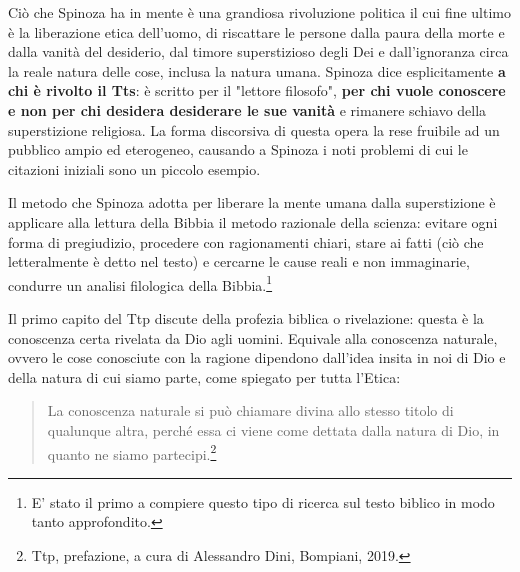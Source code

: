 Ciò che Spinoza ha in mente è
una grandiosa rivoluzione politica il cui fine ultimo è la liberazione etica dell'uomo, di riscattare le persone dalla paura
della morte e dalla vanità del desiderio, dal timore superstizioso degli Dei e dall'ignoranza circa la
reale natura delle cose, inclusa la natura umana. Spinoza dice esplicitamente \textbf{a chi è rivolto il Tts}: è scritto per il "lettore filosofo", \textbf{per chi vuole conoscere e non per chi desidera desiderare le sue vanità} e rimanere schiavo della superstizione religiosa. La forma  discorsiva di questa opera la rese fruibile ad un pubblico ampio ed eterogeneo, causando a Spinoza i noti problemi di cui le citazioni iniziali sono un piccolo esempio.

Il metodo che Spinoza adotta per liberare la mente umana dalla superstizione è applicare alla lettura della Bibbia il metodo razionale
della scienza: evitare ogni forma di pregiudizio, procedere con ragionamenti chiari, stare ai fatti (ciò che
letteralmente è detto nel testo) e cercarne le cause reali e non immaginarie, condurre un analisi filologica della Bibbia.\footnote{E' stato il primo a compiere questo tipo di ricerca sul testo biblico in modo tanto approfondito.}

Il primo capito del Ttp discute della profezia biblica o rivelazione: questa è la conoscenza certa rivelata da Dio agli uomini. Equivale alla conoscenza naturale, ovvero le cose conosciute con la ragione dipendono dall'idea insita in noi di Dio e della natura di cui siamo parte, come spiegato per tutta l'Etica:

\begin{quotation}
	\small La conoscenza naturale si può
	chiamare divina allo stesso titolo di qualunque altra, perché essa ci viene come dettata dalla natura
	di Dio, in quanto ne siamo partecipi.\footnote{Ttp, prefazione, a cura di Alessandro Dini, Bompiani, 2019.}
\end{quotation}

